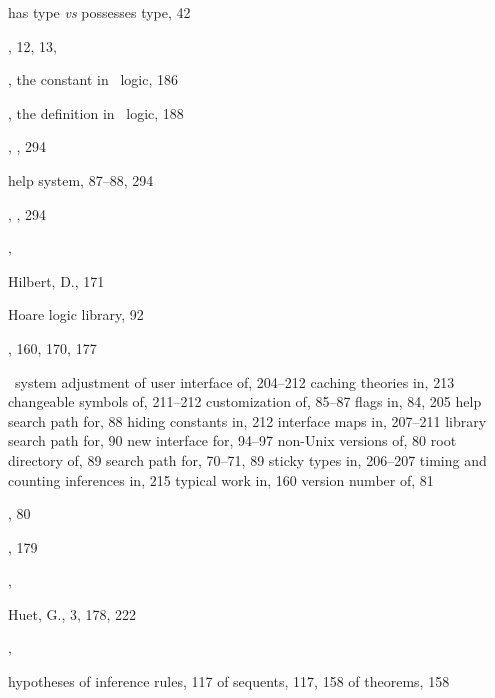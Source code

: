 \begin{theindex}
  \indexspace

  \item has type {\it vs} possesses type, 42
  \item {}, 12, 13, 
  \item {}, the constant in \HOL\ logic, 186
  \item {}, the definition in \HOL\ logic, 188
  \item {}, , 294
  \item help system, 87--88, 294
  \item {}, , 294
  \item {}, 
  \item Hilbert, D., 171
  \item Hoare logic library, 92
  \item {}, 160, 170, 177
  \item \HOL\ system
    \subitem adjustment of user interface of, 204--212
    \subitem caching theories in, 213
    \subitem changeable symbols of, 211--212
    \subitem customization of, 85--87
    \subitem flags in, 84, 205
    \subitem help search path for, 88
    \subitem hiding constants in, 212
    \subitem interface maps in, 207--211
    \subitem library search path for, 90
    \subitem new interface for, 94--97
    \subitem non-Unix versions of, 80
    \subitem root directory of, 89
    \subitem search path for, 70--71, 89
    \subitem sticky types in, 206--207
    \subitem timing and counting inferences in, 215
    \subitem typical work in, 160
    \subitem version number of, 81
  \item {}, 80
  \item {}, 179
  \item {}, 
  \item Huet, G., 3, 178, 222
  \item {}, 
  \item hypotheses
    \subitem of inference rules, 117
    \subitem of sequents, 117, 158
    \subitem of theorems, 158

  \indexspace


\end{theindex}
